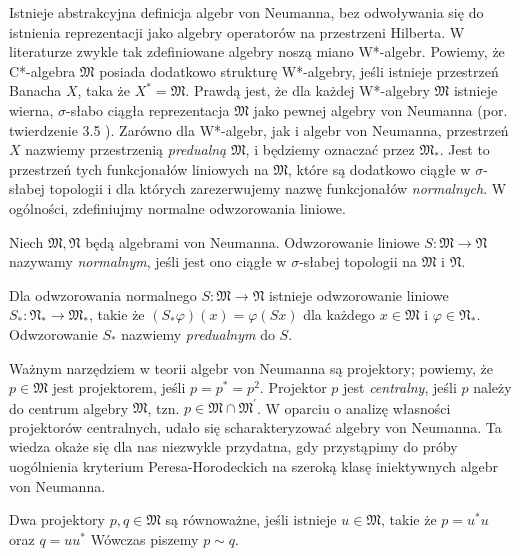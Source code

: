 Istnieje abstrakcyjna definicja algebr von Neumanna, bez odwoływania się
do istnienia reprezentacji jako algebry operatorów na przestrzeni Hilberta.
W literaturze zwykle tak zdefiniowane algebry noszą miano W*-algebr.
Powiemy, że C*-algebra $\mathfrak{M}$ posiada dodatkowo strukturę W*-algebry,
jeśli istnieje przestrzeń Banacha $X$, taka że
$X^{*} = \mathfrak{M}$.
Prawdą jest, że dla każdej W*-algebry $\mathfrak{M}$ istnieje wierna,
$\sigma$-słabo ciągła reprezentacja $\mathfrak{M}$ jako pewnej algebry von Neumanna
(por. twierdzenie 3.5 \cite{Takesaki1}).
Zarówno dla W*-algebr, jak i algebr von Neumanna,
przestrzeń $X$ nazwiemy przestrzenią \emph{predualną} $\mathfrak{M}$,
i będziemy oznaczać przez $\mathfrak{M}_{*}$.
Jest to przestrzeń tych funkcjonałów liniowych na $\mathfrak{M}$, które
są dodatkowo ciągłe w $\sigma$-słabej topologii i dla których zarezerwujemy
nazwę funkcjonałów \emph{normalnych}.
W ogólności, zdefiniujmy normalne odwzorowania liniowe.
\begin{Definition}
    \label{def:normalMap}
    Niech $\mathfrak{M}, \mathfrak{N}$ będą algebrami von Neumanna.
    Odwzorowanie liniowe $S: \mathfrak{M} \rightarrow \mathfrak{N}$
    nazywamy \emph{normalnym}, jeśli
    jest ono ciągłe w $\sigma$-słabej topologii na $\mathfrak{M}$ i $\mathfrak{N}$.
\end{Definition}
Dla odwzorowania normalnego $S: \mathfrak{M} \rightarrow \mathfrak{N}$
istnieje odwzorowanie liniowe $S_{*}: \mathfrak{N}_{*} \rightarrow \mathfrak{M}_{*}$,
takie że $(S_{*} \varphi) (x) = \varphi(Sx)$ dla każdego
$x \in \mathfrak{M}$ i $\varphi \in \mathfrak{N}_*$.
Odwzorowanie $S_{*}$ nazwiemy \emph{predualnym} do $S$.

Ważnym narzędziem w teorii algebr von Neumanna są projektory; powiemy, że
$p \in \mathfrak{M}$ jest projektorem, jeśli $p = p^{*} = p^{2}$.
Projektor $p$ jest \emph{centralny}, jeśli
$p$ należy do centrum algebry $\mathfrak{M}$, tzn.
$p \in \mathfrak{M} \cap \mathfrak{M}^{\prime}$.
W oparciu o analizę własności projektorów centralnych,
udało się scharakteryzować algebry von Neumanna.
Ta wiedza okaże się dla nas niezwykle przydatna, gdy przystąpimy do próby
uogólnienia kryterium Peresa-Horodeckich na szeroką klasę iniektywnych algebr von Neumanna.

\begin{Definition}
Dwa projektory $p, q \in \mathfrak{M}$ są równoważne,
jeśli istnieje $u \in \mathfrak{M}$, takie że
$p = u^{*} u$ oraz $ q = u u^{*}$
Wówczas piszemy $p \sim q$.
\end{Definition}

